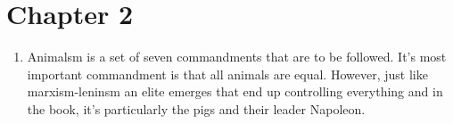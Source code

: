 \documentclass[12pt]{article}
\begin{document}
    \section{Chapter 2}

    \begin{enumerate}
        \item Animalsm is a set of seven commandments that are to be followed. It's most important commandment is that all animals are equal. However, just like marxism-leninsm an elite emerges that end up controlling everything and in the book, it's particularly the pigs and their leader Napoleon.
    \end{enumerate}

    
\end{document}
